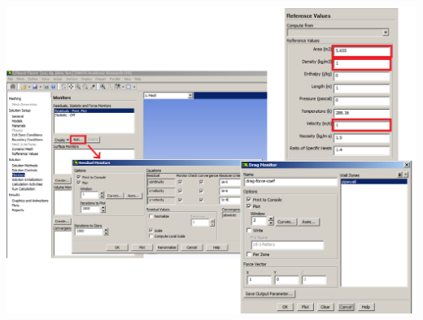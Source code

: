 \documentclass[10pt,compress, unknownkeysallowed]{beamer}
\begin{document}
\begin{frame}
\begin{columns}
\begin{column}[l]{0.5\linewidth}
{\begin{center}
                   \includegraphics[width=\columnwidth, clip]{./Figs/ProblemSetup6.pdf}
               \end{center}}
           \end{column}
    \end{columns}
\end{frame}
\end{document}
